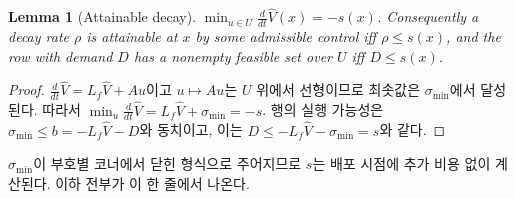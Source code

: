 \documentclass[11pt]{article}
\theoremstyle{plain}
\newtheorem{lemma}[theorem]{Lemma}
\theoremstyle{definition}
\theoremstyle{remark}
\newcommand{\Vhat}{\widehat V}
\newcommand{\Lf}{L_f}
\begin{document}
\begin{lemma}[Attainable decay]\label{lem:attain-decay}
$\displaystyle \min_{u \in U} \tfrac{d}{dt}\Vhat(x) = -s(x)$.
Consequently a decay rate $\rho$ is attainable at $x$ by some admissible control
iff $\rho \le s(x)$, and the row with demand $D$ has a nonempty feasible set over
$U$ iff $D \le s(x)$.
\end{lemma}
\begin{proof}
$\frac{d}{dt}\Vhat = \Lf\Vhat + Au$이고 $u \mapsto Au$는 $U$ 위에서 선형이므로
최솟값은 $\sigma_{\min}$에서 달성된다. 따라서
$\min_u \frac{d}{dt}\Vhat = \Lf\Vhat + \sigma_{\min} = -s$.
행의 실행 가능성은 $\sigma_{\min} \le b = -\Lf\Vhat - D$와 동치이고, 이는
$D \le -\Lf\Vhat - \sigma_{\min} = s$와 같다.
\end{proof}

\noindent
$\sigma_{\min}$이 부호별 코너에서 닫힌 형식으로 주어지므로 $s$는 배포 시점에
추가 비용 없이 계산된다. 이하 전부가 이 한 줄에서 나온다.
\end{document}
